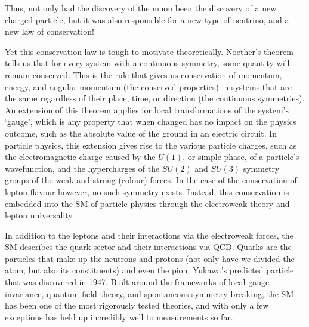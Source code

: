 Thus, not only had the discovery of the muon been the discovery of a new charged particle, but it was also responsible for a new type of neutrino, and a new law of conservation!

Yet this conservation law is tough to motivate theoretically.
Noether's theorem tells us that for every system with a continuous symmetry, some quantity will remain conserved.
This is the rule that gives us conservation of momentum, energy, and angular momentum (the conserved properties) in systems that are the same regardless of their place, time, or direction (the continuous symmetries).
An extension of this theorem applies for local transformations of the system's `gauge', which is any property that when changed has no impact on the physics outcome, such as the absolute value of the ground in an electric circuit.
In particle physics, this extension gives rise to the various particle charges, such as the electromagnetic charge caused by the $U(1)$, or simple phase, of a particle's wavefunction, and the hypercharges of the $SU(2)$ and $SU(3)$ symmetry groups of the weak and strong (colour) forces.
In the case of the conservation of lepton flavour however, no such symmetry exists.
Instead, this conservation is embedded into the \ac{SM} of particle physics through the electroweak theory and lepton universality.

In addition to the leptons and their interactions via the electroweak forces, the \ac{SM} describes the quark sector and their interactions via \ac{QCD}.
Quarks are the particles that make up the neutrons and protons (not only have we divided the atom, but also its constituents) and even the pion, Yukawa's predicted particle that was discovered in 1947.
Built around the frameworks of local gauge invariance, quantum field theory, and spontaneous symmetry breaking, the \ac{SM} has been one of the most rigorously tested theories, and with only a few exceptions has held up incredibly well to measurements so far.

